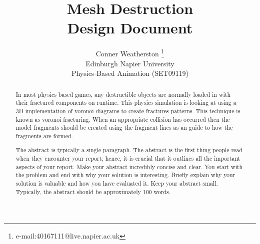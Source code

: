 \documentclass[conference,backref=page]{acmsiggraph}
\title{Mesh Destruction\\
	   Design Document}
\author{Conner Weatherston \thanks{e-mail:40167111@live.napier.ac.uk} \\
Edinburgh Napier University\\
Physics-Based Animation (SET09119)}
\begin{document}

\maketitle

\raggedbottom

\begin{abstract}

In most physics based games, any destructible objects are normally loaded in with their fractured components on runtime. This physics simulation is looking at using a 3D implementation of voronoi diagrams to create fractures patterns. This technique is known as voronoi fracturing. When an appropriate collision has occurred then the model fragments should be created using the fragment lines as an guide to how the fragments are formed.


The abstract is typically a single paragraph.  The abstract is the first thing people read when they encounter your report; hence, it is crucial that it outlines all the important aspects of your report.  Make your abstract incredibly concise and clear.  You start with the problem and end with why your solution is interesting.  Briefly explain why your solution is valuable and how you have evaluated it.  Keep your abstract small.  Typically, the abstract should be approximately 100 words.

\end{abstract}



\keywordlist

\end{document}
